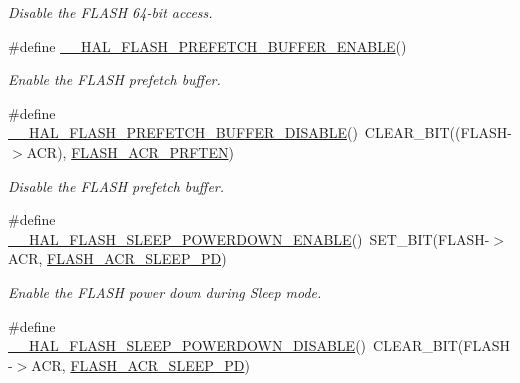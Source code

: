 \begin{DoxyCompactItemize}
\begin{DoxyCompactList}\small\item\em Disable the F\-L\-A\-S\-H 64-\/bit access. \end{DoxyCompactList}\item 
\#define \hyperlink{group___f_l_a_s_h_ex___exported___macros_gad36059641057f824516303ea92734e6f}{\-\_\-\-\_\-\-H\-A\-L\-\_\-\-F\-L\-A\-S\-H\-\_\-\-P\-R\-E\-F\-E\-T\-C\-H\-\_\-\-B\-U\-F\-F\-E\-R\-\_\-\-E\-N\-A\-B\-L\-E}()
\begin{DoxyCompactList}\small\item\em Enable the F\-L\-A\-S\-H prefetch buffer. \end{DoxyCompactList}\item 
\#define \hyperlink{group___f_l_a_s_h_ex___exported___macros_ga646a4cb92e85659334d14a8c78f0ede8}{\-\_\-\-\_\-\-H\-A\-L\-\_\-\-F\-L\-A\-S\-H\-\_\-\-P\-R\-E\-F\-E\-T\-C\-H\-\_\-\-B\-U\-F\-F\-E\-R\-\_\-\-D\-I\-S\-A\-B\-L\-E}()~C\-L\-E\-A\-R\-\_\-\-B\-I\-T((F\-L\-A\-S\-H-\/$>$A\-C\-R), \hyperlink{group___peripheral___registers___bits___definition_ga082e7e91fffee86db39676396d01a8e0}{F\-L\-A\-S\-H\-\_\-\-A\-C\-R\-\_\-\-P\-R\-F\-T\-E\-N})
\begin{DoxyCompactList}\small\item\em Disable the F\-L\-A\-S\-H prefetch buffer. \end{DoxyCompactList}\item 
\#define \hyperlink{group___f_l_a_s_h_ex___exported___macros_ga93004e7cf2386d656acd467a5013015e}{\-\_\-\-\_\-\-H\-A\-L\-\_\-\-F\-L\-A\-S\-H\-\_\-\-S\-L\-E\-E\-P\-\_\-\-P\-O\-W\-E\-R\-D\-O\-W\-N\-\_\-\-E\-N\-A\-B\-L\-E}()~S\-E\-T\-\_\-\-B\-I\-T(F\-L\-A\-S\-H-\/$>$A\-C\-R, \hyperlink{group___peripheral___registers___bits___definition_gaabe351b40c2a8d34733c07234d3bcba4}{F\-L\-A\-S\-H\-\_\-\-A\-C\-R\-\_\-\-S\-L\-E\-E\-P\-\_\-\-P\-D})
\begin{DoxyCompactList}\small\item\em Enable the F\-L\-A\-S\-H power down during Sleep mode. \end{DoxyCompactList}\item 
\#define \hyperlink{group___f_l_a_s_h_ex___exported___macros_gafde0b06ca855f4bb02e94ba21ca8a19b}{\-\_\-\-\_\-\-H\-A\-L\-\_\-\-F\-L\-A\-S\-H\-\_\-\-S\-L\-E\-E\-P\-\_\-\-P\-O\-W\-E\-R\-D\-O\-W\-N\-\_\-\-D\-I\-S\-A\-B\-L\-E}()~C\-L\-E\-A\-R\-\_\-\-B\-I\-T(F\-L\-A\-S\-H-\/$>$A\-C\-R, \hyperlink{group___peripheral___registers___bits___definition_gaabe351b40c2a8d34733c07234d3bcba4}{F\-L\-A\-S\-H\-\_\-\-A\-C\-R\-\_\-\-S\-L\-E\-E\-P\-\_\-\-P\-D})

\end{DoxyCompactItemize}
